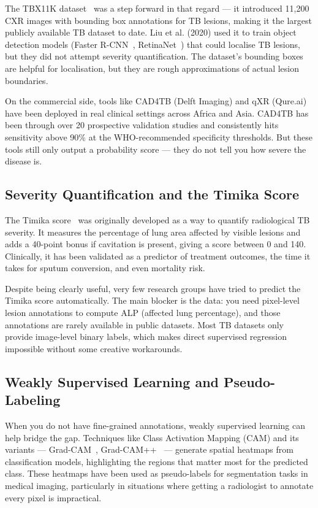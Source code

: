 \documentclass[12pt]{report}
\begin{document}
The TBX11K dataset~\cite{ref1} was a step forward in that regard --- it introduced 11,200 CXR images with bounding box annotations for TB lesions, making it the largest publicly available TB dataset to date. Liu et al. (2020) used it to train object detection models (Faster R-CNN~\cite{ref17}, RetinaNet~\cite{ref18}) that could localise TB lesions, but they did not attempt severity quantification. The dataset's bounding boxes are helpful for localisation, but they are rough approximations of actual lesion boundaries.

On the commercial side, tools like CAD4TB (Delft Imaging) and qXR (Qure.ai) have been deployed in real clinical settings across Africa and Asia. CAD4TB has been through over 20 prospective validation studies and consistently hits sensitivity above 90\% at the WHO-recommended specificity thresholds. But these tools still only output a probability score --- they do not tell you how severe the disease is.

\subsection{Severity Quantification and the Timika Score}
The Timika score~\cite{ref2} was originally developed as a way to quantify radiological TB severity. It measures the percentage of lung area affected by visible lesions and adds a 40-point bonus if cavitation is present, giving a score between 0 and 140. Clinically, it has been validated as a predictor of treatment outcomes, the time it takes for sputum conversion, and even mortality risk.

Despite being clearly useful, very few research groups have tried to predict the Timika score automatically. The main blocker is the data: you need pixel-level lesion annotations to compute ALP (affected lung percentage), and those annotations are rarely available in public datasets. Most TB datasets only provide image-level binary labels, which makes direct supervised regression impossible without some creative workarounds.

\subsection{Weakly Supervised Learning and Pseudo-Labeling}
When you do not have fine-grained annotations, weakly supervised learning can help bridge the gap. Techniques like Class Activation Mapping (CAM) and its variants --- Grad-CAM~\cite{ref12}, Grad-CAM++~\cite{ref13} --- generate spatial heatmaps from classification models, highlighting the regions that matter most for the predicted class. These heatmaps have been used as pseudo-labels for segmentation tasks in medical imaging, particularly in situations where getting a radiologist to annotate every pixel is impractical.
\end{document}
